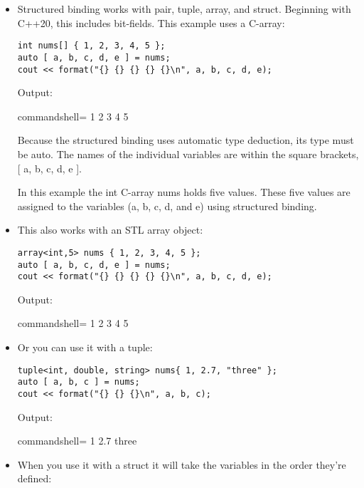 \begin{itemize}
\item 
Structured binding works with pair, tuple, array, and struct. Beginning with C++20, this includes bit-fields. This example uses a C-array:

\begin{lstlisting}[style=styleCXX]
int nums[] { 1, 2, 3, 4, 5 };
auto [ a, b, c, d, e ] = nums;
cout << format("{} {} {} {} {}\n", a, b, c, d, e);
\end{lstlisting}

Output:

\begin{tcblisting}{commandshell={}}
1 2 3 4 5
\end{tcblisting}

Because the structured binding uses automatic type deduction, its type must be auto. The names of the individual variables are within the square brackets, [ a, b, c, d, e ].

In this example the int C-array nums holds five values. These five values are assigned to the variables (a, b, c, d, and e) using structured binding.

\item 
This also works with an STL array object:

\begin{lstlisting}[style=styleCXX]
array<int,5> nums { 1, 2, 3, 4, 5 };
auto [ a, b, c, d, e ] = nums;
cout << format("{} {} {} {} {}\n", a, b, c, d, e);
\end{lstlisting}

Output:

\begin{tcblisting}{commandshell={}}
1 2 3 4 5
\end{tcblisting}

\item 
Or you can use it with a tuple:

\begin{lstlisting}[style=styleCXX]
tuple<int, double, string> nums{ 1, 2.7, "three" };
auto [ a, b, c ] = nums;
cout << format("{} {} {}\n", a, b, c);
\end{lstlisting}

Output:

\begin{tcblisting}{commandshell={}}
1 2.7 three
\end{tcblisting}

\item 
When you use it with a struct it will take the variables in the order they're defined:


\end{itemize}
